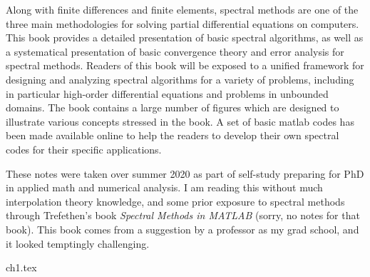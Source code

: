 \documentclass{../booknotes}
\begin{document}
\maketitle
\begin{pubdescrip}

	\indent Along with finite differences and finite elements, spectral methods are one of the three main methodologies for solving partial differential equations on computers. This book provides a detailed presentation of basic spectral algorithms, as well as a systematical presentation of  basic convergence theory and error analysis for spectral methods. Readers of this book will be exposed to a unified framework for designing and analyzing spectral algorithms for a variety of problems, including in particular high-order differential equations and problems in unbounded domains. The book contains a large number of figures which are designed to illustrate various concepts stressed in the book. A set of basic matlab codes has been made available online to help the readers to develop their own spectral codes for their specific applications.
\end{pubdescrip}

\begin{transcribernote}
	\indent These notes were taken over summer 2020 as part of self-study preparing for PhD in applied math and numerical analysis. I am reading this without much interpolation theory knowledge, and some prior exposure to spectral methods through Trefethen's book \textit{Spectral Methods in MATLAB} (sorry, no notes for that book). This book comes from a suggestion by a professor as my grad school, and it looked temptingly challenging.
\end{transcribernote}

\tableofcontents


{ch1.tex}
\end{document}
